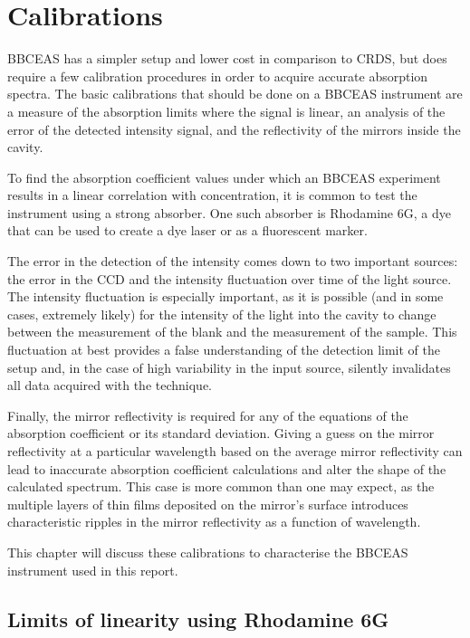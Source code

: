 \chapter{Calibrations}\label{chap:calibration}

\acl{BBCEAS} has a simpler setup and lower cost in comparison to \ac{CRDS}, but
does require a few calibration procedures in order to acquire accurate
absorption spectra. The basic calibrations that should be done on a
\ac{BBCEAS} instrument are a measure of the absorption limits where the signal
is linear, an analysis of the error of the detected intensity signal, and the
reflectivity of the mirrors inside the cavity.

To find the absorption coefficient values under which an \ac{BBCEAS}
experiment results in a linear correlation with concentration, it is common to
test the instrument using a strong absorber. One such absorber is Rhodamine
6G, a dye that can be used to create a dye laser or as a fluorescent marker.

The error in the detection of the intensity comes down to two important
sources: the error in the \ac{CCD} and the intensity fluctuation over time of
the light source. The intensity fluctuation is especially important, as it is
possible (and in some cases, extremely likely) for the intensity of the light
into the cavity to change between the measurement of the blank and the
measurement of the sample. This fluctuation at best provides a false
understanding of the detection limit of the setup and, in the case of high
variability in the input source, silently invalidates all data acquired with
the technique.

Finally, the mirror reflectivity is required for any of the equations of the
absorption coefficient or its standard deviation. Giving a guess on the mirror
reflectivity at a particular wavelength based on the average mirror
reflectivity can lead to inaccurate absorption coefficient calculations and
alter the shape of the calculated spectrum. This case is more common than one
may expect, as the multiple layers of thin films deposited on the mirror's
surface introduces characteristic ripples in the mirror reflectivity as a
function of wavelength.

This chapter will discuss these calibrations to characterise the \ac{BBCEAS}
instrument used in this report.

\section{Limits of linearity using Rhodamine 6G}\label{sec:rhodamine}

